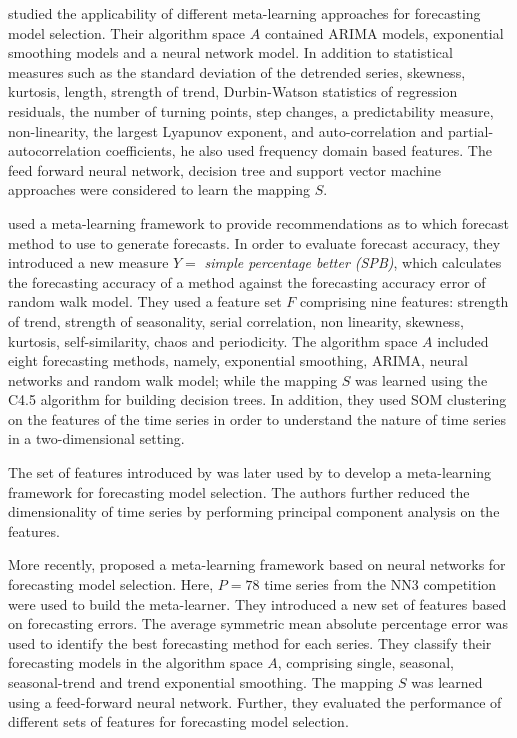 \documentclass[11pt,a4paper,]{article}
\theoremstyle{definition}
\theoremstyle{definition}
\theoremstyle{definition}
\theoremstyle{remark}
\begin{document}
\textcite{lemke2010meta} studied the applicability of different
meta-learning approaches for forecasting model selection. Their
algorithm space \(A\) contained ARIMA models, exponential smoothing
models and a neural network model. In addition to statistical measures
such as the standard deviation of the detrended series, skewness,
kurtosis, length, strength of trend, Durbin-Watson statistics of
regression residuals, the number of turning points, step changes, a
predictability measure, non-linearity, the largest Lyapunov exponent,
and auto-correlation and partial-autocorrelation coefficients, he also
used frequency domain based features. The feed forward neural network,
decision tree and support vector machine approaches were considered to
learn the mapping \(S\).

\textcite{wang2009rule} used a meta-learning framework to provide
recommendations as to which forecast method to use to generate
forecasts. In order to evaluate forecast accuracy, they introduced a new
measure \(Y =\) \emph{simple percentage better (SPB)}, which calculates
the forecasting accuracy of a method against the forecasting accuracy
error of random walk model. They used a feature set \(F\) comprising
nine features: strength of trend, strength of seasonality, serial
correlation, non linearity, skewness, kurtosis, self-similarity, chaos
and periodicity. The algorithm space \(A\) included eight forecasting
methods, namely, exponential smoothing, ARIMA, neural networks and
random walk model; while the mapping \(S\) was learned using the C4.5
algorithm for building decision trees. In addition, they used SOM
clustering on the features of the time series in order to understand the
nature of time series in a two-dimensional setting.

The set of features introduced by \textcite{wang2009rule} was later used
by \textcite{widodomodel} to develop a meta-learning framework for
forecasting model selection. The authors further reduced the
dimensionality of time series by performing principal component analysis
on the features.

More recently, \textcite{kuck2016meta} proposed a meta-learning
framework based on neural networks for forecasting model selection.
Here, \(P = 78\) time series from the NN3 competition were used to build
the meta-learner. They introduced a new set of features based on
forecasting errors. The average symmetric mean absolute percentage error
was used to identify the best forecasting method for each series. They
classify their forecasting models in the algorithm space \(A\),
comprising single, seasonal, seasonal-trend and trend exponential
smoothing. The mapping \(S\) was learned using a feed-forward neural
network. Further, they evaluated the performance of different sets of
features for forecasting model selection.
\end{document}

